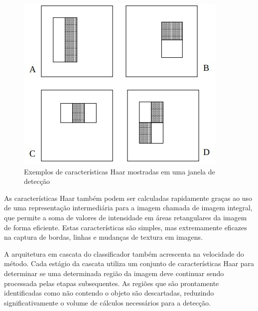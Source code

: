 \documentclass[12pt, %
openright, 
oneside, %
a4paper,    %
brazil]{facom-ufu-abntex2}
\begin{document}

\begin{figure}[!ht]
	\centering
	\includegraphics[width=0.7\linewidth]{haar_features.jpeg}
	\caption[Exemplos de características Haar mostradas em uma janela de
		detecção]{Exemplos de características Haar mostradas em uma janela de detecção}
	\label{fig:graficosVariandoTamanhoRede}
\end{figure}

As características Haar também podem ser calculadas rapidamente graças ao uso
de uma representação intermediária para a imagem chamada de imagem integral,
que permite a soma de valores de intensidade em áreas retangulares da imagem de
forma eficiente. Estas características são simples, mas extremamente eficazes
na captura de bordas, linhas e mudanças de textura em imagens.

A arquitetura em cascata do classificador também acrescenta na velocidade do
método. Cada estágio da cascata utiliza um conjunto de características Haar
para determinar se uma determinada região da imagem deve continuar sendo
processada pelas etapas subsequentes. As regiões que são prontamente
identificadas como não contendo o objeto são descartadas, reduzindo
significativamente o volume de cálculos necessários para a detecção.
\end{document}
